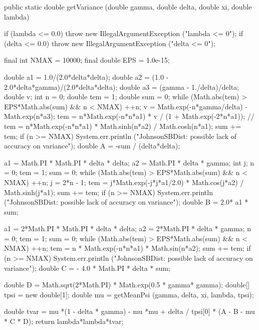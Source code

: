 \begin{code}

   public static double getVariance (double gamma, double delta,
                                     double xi, double lambda)\begin{hide} {
      if (lambda <= 0.0)
         throw new IllegalArgumentException ("lambda <= 0");
      if (delta <= 0.0)
         throw new IllegalArgumentException ("delta <= 0");

      final int NMAX = 10000;
      final double EPS = 1.0e-15;

      double a1 = 1.0/(2.0*delta*delta);
      double a2 = (1.0 - 2.0*delta*gamma)/(2.0*delta*delta);
      double a3 = (gamma - 1./delta)/delta;
      double v;
      int n = 0;
      double tem = 1;
      double sum = 0;
      while (Math.abs(tem) > EPS*Math.abs(sum) && n < NMAX) {
         ++n;
         v = Math.exp(-n*gamma/delta) - Math.exp(n*a3);
         tem = n*Math.exp(-n*n*a1) * v / (1 + Math.exp(-2*n*a1));
       //  tem = n*Math.exp(-n*n*a1) * Math.sinh(n*a2) / Math.cosh(n*a1);
         sum += tem;
      }
      if (n >= NMAX)
         System.err.println ("JohnsonSBDist:  possible lack of accuracy on variance");
      double A = -sum / (delta*delta);

      a1 = Math.PI * Math.PI * delta * delta;
      a2 = Math.PI * delta * gamma;
      int j;
      n = 0;
      tem = 1;
      sum = 0;
      while (Math.abs(tem) > EPS*Math.abs(sum) && n < NMAX) {
         ++n;
         j = 2*n - 1;
         tem = j*Math.exp(-j*j*a1/2.0) * Math.cos(j*a2) / Math.sinh(j*a1);
         sum += tem;
      }
      if (n >= NMAX)
         System.err.println ("JohnsonSBDist:  possible lack of accuracy on variance");
      double B = 2.0* a1 * sum;

      a1 = 2*Math.PI * Math.PI * delta * delta;
      a2 = 2*Math.PI * delta * gamma;
      n = 0;
      tem = 1;
      sum = 0;
      while (Math.abs(tem) > EPS*Math.abs(sum) && n < NMAX) {
         ++n;
         tem = n * Math.exp(-n*n*a1) * Math.sin(n*a2);
         sum += tem;
      }
      if (n >= NMAX)
         System.err.println ("JohnsonSBDist:  possible lack of accuracy on variance");
      double C = - 4.0 * Math.PI * delta * sum;

      double D = Math.sqrt(2*Math.PI) * Math.exp(0.5 * gamma* gamma);
      double[] tpsi = new double[1];
      double mu = getMeanPsi (gamma, delta, xi, lambda, tpsi);

      double tvar = mu *(1 - delta * gamma) - mu *mu +
                    delta / tpsi[0] * (A - B - mu * C * D);
      return lambda*lambda*tvar;

   }\end{hide}
\end{code}
